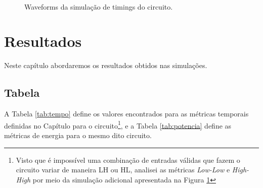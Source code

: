 \documentclass{iiufrgs}
\begin{document}
\begin{figure}[htbp]
    \centering
    \caption{Waveforms da simulação de timings do circuito.}
     \\
    \label{fig:timing}
\end{figure}

\chapter{Resultados}\label{resultados}
Neste capítulo abordaremos os resultados obtidos nas simulações.

\section{Tabela}\label{tabela}
A Tabela \ref{tab:tempo} define os valores encontrados para as métricas temporais definidas no Capítulo  para o circuito\footnote{Visto que é impossível uma combinação de entradas válidas que fazem o circuito variar de maneira LH ou HL, analisei as métricas \textit{Low-Low} e \textit{High-High} por meio da simulação adicional apresentada na Figura \ref{fig:timing}}, e a Tabela \ref{tab:potencia} define as métricas de energia para o mesmo dito circuito.
\end{document}
